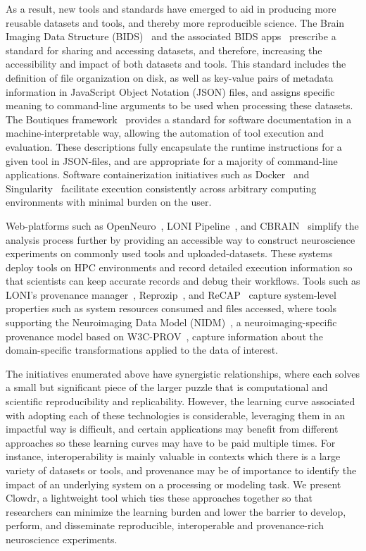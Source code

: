 \documentclass[fleqn,12pt]{SelfArx_ch} %
\begin{document}
As a result, new tools and standards have emerged to aid in producing more reusable datasets and tools, and thereby
more reproducible science. The Brain Imaging Data Structure (BIDS)~\cite{Gorgolewski2016-om} and the associated BIDS
apps~\cite{Gorgolewski2017-sr} prescribe a standard for sharing and accessing datasets, and therefore, increasing the
accessibility and impact of both datasets and tools. This standard includes the definition of file organization on
disk, as well as key-value pairs of metadata information in JavaScript Object Notation (JSON) files, and assigns
specific meaning to command-line arguments to be used when processing these datasets. The Boutiques
framework~\cite{Glatard2018-uw} provides a standard for software documentation in a machine-interpretable way, allowing
the automation of tool execution and evaluation. These descriptions fully encapsulate the runtime instructions for a
given tool in JSON-files, and are appropriate for a majority of command-line applications. Software containerization
initiatives such as Docker~\cite{Merkel2014-vu} and Singularity~\cite{Kurtzer2017-kq} facilitate execution consistently
across arbitrary computing environments with minimal burden on the user.

Web-platforms such as OpenNeuro~\cite{Poldrack2013-wi}, LONI Pipeline~\cite{Rex2003-pr}, and
CBRAIN~\cite{Sherif2014-ve} simplify the analysis process further by providing an accessible way to construct
neuroscience experiments on commonly used tools and uploaded-datasets. These systems deploy tools on HPC environments
and record detailed execution information so that scientists can keep accurate records and debug their workflows. Tools
such as LONI’s provenance manager~\cite{Dinov2010-yq}, Reprozip~\cite{Chirigati2016-ep}, and ReCAP~\cite{Hasham2018-hn}
capture system-level properties such as system resources consumed and files accessed, where tools supporting the
Neuroimaging Data Model (NIDM)~\cite{Sochat2016-gl}, a neuroimaging-specific provenance model based on
W3C-PROV~\cite{Missier2013-ml}, capture information about the domain-specific transformations applied to the data of
interest.

The initiatives enumerated above have synergistic relationships, where each solves a small but significant piece of the
larger puzzle that is computational and scientific reproducibility and replicability. However, the learning curve
associated with adopting each of these technologies is considerable, leveraging them in an impactful way is difficult,
and certain applications may benefit from different approaches so these learning curves may have to be paid multiple
times. For instance, interoperability is mainly valuable in contexts which there is a large variety of datasets or
tools, and provenance may be of importance to identify the impact of an underlying system on a processing or modeling
task. We present Clowdr, a lightweight tool which ties these approaches together so that researchers can minimize the
learning burden and lower the barrier to develop, perform, and disseminate reproducible, interoperable and
provenance-rich neuroscience experiments.
\end{document}
